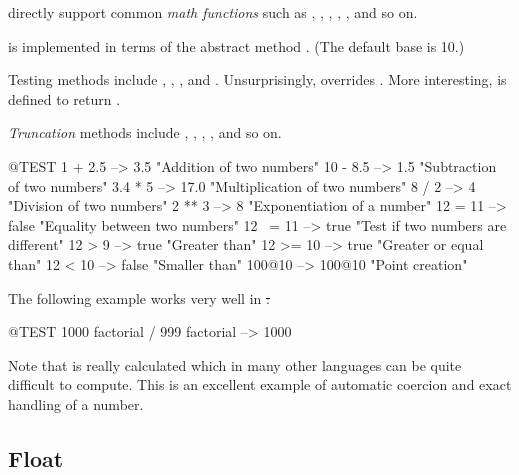 \documentclass[a4paper,10pt,twoside]{book}
\begin{document}
 directly support common \emph{math functions} such as , , , , , and so on.

 is implemented in terms of the abstract method .
(The default base is 10.)

Testing methods include , , , and .
Unsurprisingly,  overrides .
More interesting,  is defined to return .

\emph{Truncation} methods include , , , , and so on.

\begin{code}{@TEST}
1 + 2.5     --> 3.5             "Addition of two numbers"
10 - 8.5   --> 1.5              "Subtraction of two numbers"
3.4 * 5      --> 17.0           "Multiplication of two numbers"
8 / 2         --> 4                 "Division of two numbers"
2 ** 3         --> 8                 "Exponentiation of a number"
12 = 11    --> false           "Equality between two numbers"
12 ~= 11 --> true            "Test if two numbers are different"
12 > 9      --> true            "Greater than"
12 >= 10  --> true            "Greater or equal  than"
12 < 10    --> false           "Smaller than"
100@10   --> 100@10    "Point creation"
\end{code}

The following example works very well in \st:
\begin{code}{@TEST}
1000 factorial / 999 factorial --> 1000
\end{code}
Note that  is really calculated which in many other languages can be quite difficult to compute.
This is an excellent example of automatic coercion and exact handling of a number.


\subsection{Float}
\end{document}
